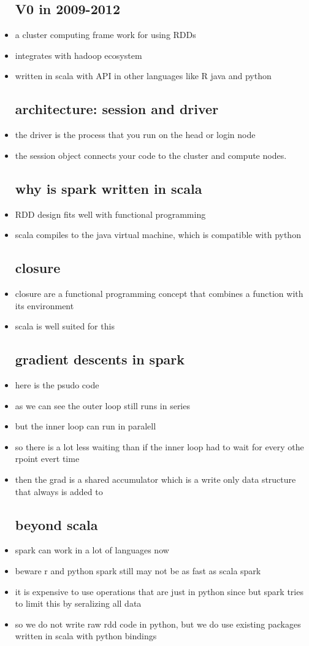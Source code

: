\documentclass{article}
\begin{document}
\begin{itemize}
\subsection*{V0 in  2009-2012}
\item a cluster computing frame work for using RDDs
\item integrates with hadoop ecosystem 
\item written in scala with API in other languages like R java and python
\subsection*{architecture: session and driver}
\item the driver is the process that you run on the head or login node 
\item the session object connects your code to the cluster and compute nodes. 
\subsection*{why is spark written in scala}
\item RDD design fits well with functional programming
\item scala compiles to the java virtual machine, which is compatible with python
\subsection*{closure}
\item closure are a functional programming concept that combines a function with its environment 
\item scala is well suited for this 
\subsection*{gradient descents in spark}
\item here is the psudo code 
\item as we can see the outer loop still runs in series 
\item but the inner loop can run in paralell 
\item so there is a lot less waiting than if the inner loop had to wait for every othe rpoint evert time 
\item then the grad is a shared accumulator which is a write only data structure that always is added to 
\subsection*{beyond scala}
\item spark can work in a lot of languages now 
\item beware r and python spark still may not be as fast as scala spark
\item it is expensive to use operations that are just in python since but spark tries to limit this by seralizing all data
\item so we do not write raw rdd code in python, but we do use existing packages written in scala with python bindings 

\end{itemize}
\end{document}
